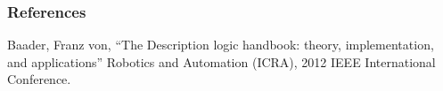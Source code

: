 
\begin{frame}
  \frametitle{References}
  \footnotesize{
  \begin{thebibliography}{99} %
  
     Baader, Franz von,
    \newblock “The Description logic handbook: theory, implementation, and applications”
    \newblock Robotics and Automation ({ICRA)}, 2012 {IEEE} International Conference.
  \end{thebibliography}
  }
\end{frame}


	   
	  

